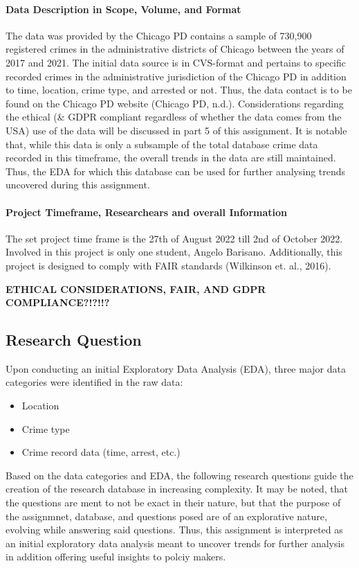 \documentclass[a4paper]{article}
\begin{document}
\paragraph{Data Description in Scope, Volume, and Format}
The data was provided by the Chicago PD contains a sample of 730,900 registered crimes in the administrative districts of Chicago between the years of 2017 and 2021. The initial data source is in CVS-format and pertains to specific recorded crimes in the administrative jurisdiction of the Chicago PD in addition to time, location, crime type, and arrested or not. Thus, the data contact is to be found on the Chicago PD website (Chicago PD, n.d.). Considerations regarding the ethical (\& GDPR compliant regardless of whether the data comes from the USA) use of the data will be discussed in part 5 of this assignment. It is notable that, while this data is only a subsample of the total database crime data recorded in this timeframe, the overall trends in the data are still maintained. Thus, the EDA for which this database can be used for further analysing trends uncovered during this assignment. 

\paragraph{Project Timeframe, Researchears and overall Information} The set project time frame is the 27th of August 2022 till 2nd of October 2022. Involved in this project is only one student, Angelo Barisano. Additionally, this project is designed to comply with FAIR standards (Wilkinson et. al., 2016).


\textbf{ETHICAL CONSIDERATIONS, FAIR, AND GDPR COMPLIANCE?!?!!?}



\subsection{Research Question}
Upon conducting an initial Exploratory Data Analysis (EDA), three major data categories were identified in the raw data: 

\begin{itemize}
  \item Location
  \item Crime type
  \item Crime record data (time, arrest, etc.)
\end{itemize}

Based on the data categories and EDA, the following research questions guide the creation of the research database in increasing complexity. It may be noted, that the questions are ment to not be exact in their nature, but that the purpose of the assignmnet, database, and questions posed are of an explorative nature, evolving while answering said questions. Thus, this assignment is interpreted as an initial exploratory data analysis meant to uncover trends for further analysis in addition offering useful insights to polciy makers. 
\end{document}
